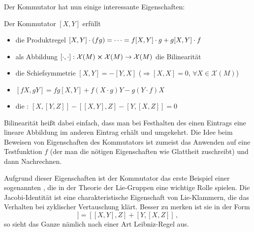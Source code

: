 \documentclass[../H_Analysis_main.tex]{subfiles}
\begin{document}
Der Kommutator hat nun einige interessante Eigenschaften:
\begin{satz}
Der Kommutator $[X, Y]$ erfüllt
\begin{itemize}
\item die Produktregel $[X, Y] \cdot \qty(fg) = \dots = f [X, Y] \cdot g + g [X, Y] \cdot f$

\item als Abbildung $[\cdot, \cdot]: \mathcal{X}(M) \cross \mathcal{X}(M) \rightarrow \mathcal{X}(M)$ die Bilinearität

\item die Schiefsymmetrie $[X, Y] = - [Y, X]$ ($\Rightarrow [X, X] = 0, \, \forall X \in \mathcal{X}(M)$)

\item $[f X, g Y] = fg [X, Y] + f (X \cdot g) Y - g (Y \cdot f) X$%

\item die : $[X, [Y, Z]] - [[X, Y], Z] - [Y, [X, Z]] = 0$
\end{itemize}
\end{satz}

Bilinearität heißt dabei einfach, dass man bei Festhalten des einen Eintrags eine lineare Abbildung im anderen Eintrag erhält und umgekehrt. Die Idee beim Beweisen von Eigenschaften des Kommutators ist zumeist das Anwenden auf eine Testfunktion $f$ (der man die nötigen Eigenschaften wie Glattheit zuschreibt) und dann Nachrechnen.

Aufgrund dieser Eigenschaften ist der Kommutator das erste Beispiel einer sogenannten , die in der Theorie der Lie-Gruppen eine wichtige Rolle spielen. Die Jacobi-Identität ist eine charakteristische Eigenschaft von Lie-Klammern, die das Verhalten bei zyklischer Vertauschung klärt. Besser zu merken ist sie in der Form
\begin{equation*}
[X, [Y, Z]] = [[X, Y], Z] + [Y, [X, Z]] \, ,
\end{equation*}
so sieht das Ganze nämlich nach einer Art Leibniz-Regel aus.
\end{document}
